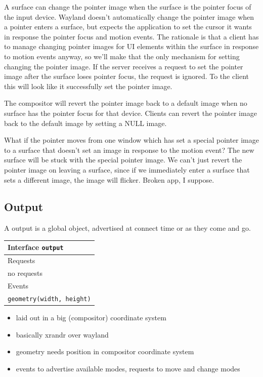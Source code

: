 \documentclass{article}
\begin{document}
A surface can change the pointer image when the surface is the pointer
focus of the input device.  Wayland doesn't automatically change the
pointer image when a pointer enters a surface, but expects the
application to set the cursor it wants in response the pointer
focus and motion events.  The rationale is that a client has to manage
changing pointer images for UI elements within the surface in response
to motion events anyway, so we'll make that the only mechanism for
setting changing the pointer image.  If the server receives a request
to set the pointer image after the surface loses pointer focus, the
request is ignored.  To the client this will look like it successfully
set the pointer image.

The compositor will revert the pointer image back to a default image
when no surface has the pointer focus for that device.  Clients can
revert the pointer image back to the default image by setting a NULL
image.

What if the pointer moves from one window which has set a special
pointer image to a surface that doesn't set an image in response to
the motion event?  The new surface will be stuck with the special
pointer image.  We can't just revert the pointer image on leaving a
surface, since if we immediately enter a surface that sets a different
image, the image will flicker.  Broken app, I suppose.

\subsection{Output}

A output is a global object, advertised at connect time or as they
come and go.

\begin{tabular}{l}
  \hline 
  Interface \texttt{output} \\ \hline 
  Requests \\ \hline 
  no requests \\ \hline
  Events \\ \hline
  \texttt{geometry(width, height)} \\ \hline
\end{tabular}

\begin{itemize}
\item laid out in a big (compositor) coordinate system
\item basically xrandr over wayland
\item geometry needs position in compositor coordinate system\
\item events to advertise available modes, requests to move and change
  modes
\end{itemize}
\end{document}
